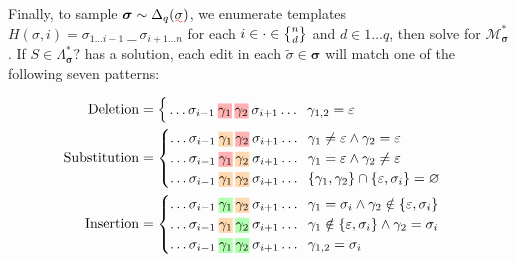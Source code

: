 \documentclass[sigplan,review,anonymous,acmsmall]{acmart}\settopmatter{printfolios=false,printccs=false,printacmref=false}
\begin{document}
Finally, to sample $\bm{\sigma}\sim\Delta_{q}(\err{\sigma})$, we enumerate templates $H(\sigma, i) = \sigma_{1\ldots i-1}\:\text{\_ \_}\:\sigma_{i+1\ldots n}$ for each $i \in \cdot \in \stirlingii{n}{d}$ and $d \in 1\ldots q$, then solve for $\mathcal{M}_{\bm\sigma}^*$. If $S \in \Lambda^*_{\bm\sigma}?$ has a solution, each edit in each $\tilde{\sigma} \in \bm\sigma$ will match one of the following seven patterns:\vspace{-10pt}

\begin{align*}
    \text{Deletion}&=\begin{cases}
                         \,\ldots\sigma_{i-1}\:\text{\hlred{$\gamma_1$}\:\hlred{$\gamma_2$}}\:\sigma_{i+1}\ldots\hspace{0.2cm}\gamma_{1, 2} = \varepsilon\label{eq:del}
    \end{cases}\\
    \text{Substitution}&=\begin{cases}
                             \ldots\sigma_{i-1}\:\text{\hlorange{$\gamma_1$}\:\hlred{$\gamma_2$}}\:\sigma_{i+1}\ldots\hspace{0.2cm}\gamma_1 \neq \varepsilon \land \gamma_2 = \varepsilon\\
                             \ldots\sigma_{i-1}\:\text{\hlred{$\gamma_1$}\:\hlorange{$\gamma_2$}}\:\sigma_{i+1}\ldots\hspace{0.2cm}\gamma_1 = \varepsilon \land \gamma_2 \neq \varepsilon\\
                             \ldots\sigma_{i-1}\:\text{\hlorange{$\gamma_1$}\:\hlorange{$\gamma_2$}}\:\sigma_{i+1}\ldots\hspace{0.2cm}\{\gamma_1, \gamma_2\}\cap\{\varepsilon, \sigma_i\} = \varnothing
    \end{cases}\\
    \text{Insertion}&=\begin{cases}
                          \ldots\sigma_{i-1}\:\text{\hlgreen{$\gamma_1$}\:\hlorange{$\gamma_2$}}\:\sigma_{i+1}\ldots\hspace{0.2cm}\gamma_1 = \sigma_i \land \gamma_2 \notin \{\varepsilon,  \sigma_i\}\label{eq:ins2}\\
                          \ldots\sigma_{i-1}\:\text{\hlorange{$\gamma_1$}\:\hlgreen{$\gamma_2$}}\:\sigma_{i+1}\ldots\hspace{0.2cm}\gamma_1 \notin \{\varepsilon, \sigma_i\} \land \gamma_2 = \sigma_i\label{eq:ins1}\\
                          \ldots\sigma_{i-1}\:\text{\hlgreen{$\gamma_1$}\:\hlgreen{$\gamma_2$}}\:\sigma_{i+1}\ldots\hspace{0.2cm}\gamma_{1,2} = \sigma_i\label{eq:copy}
    \end{cases}
\end{align*}
\end{document}
